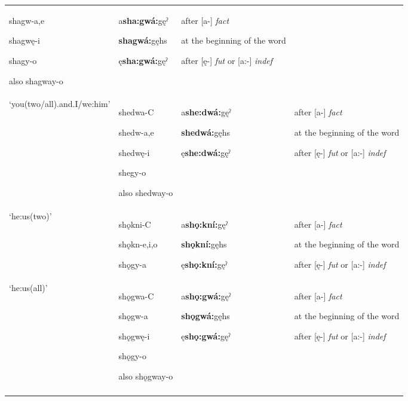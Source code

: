 \begin{table}
{\begin{tabularx}{\textwidth}{XXXX}
shagw-a,e

shagwę-i

shagy-o

also shagway-o & a\textbf{sha:gwá:}gęˀ

\textbf{shagwá:}gęhs

ę\textbf{sha:gwá:}gęˀ & after [a-] \textit{fact}

at the beginning of the word 

after [ę-] \textit{fut} or [a:-] \textit{indef}\\
‘you(two/all).and.I/we:him’ & shedwa-C

shedw-a,e

shedwę-i

shegy-o

also shedway-o & a\textbf{she:dwá:}gęˀ

\textbf{shedwá:}gęhs

ę\textbf{she:dwá:}gęˀ & after [a-] \textit{fact}

at the beginning of the word 

after [ę-] \textit{fut} or [a:-] \textit{indef}\\
‘he:us(two)’ & shǫkni-C

shǫkn-e,i,o

shǫgy-a & a\textbf{shǫ:kní:}gęˀ

\textbf{shǫkní:}gęhs

ę\textbf{shǫ:kní:}gęˀ & after [a-] \textit{fact}

at the beginning of the word 

after [ę-] \textit{fut} or [a:-] \textit{indef}\\
‘he:us(all)’ & shǫgwa-C

shǫgw-a

shǫgwę-i

shǫgy-o

also shǫgway-o & a\textbf{shǫ:gwá:}gęˀ

\textbf{shǫgwá:}gęhs

ę\textbf{shǫ:gwá:}gęˀ & after [a-] \textit{fact}

at the beginning of the word 

after [ę-] \textit{fut} or [a:-] \textit{indef}\\
\lspbottomrule
\end{tabularx}}
\end{table}


